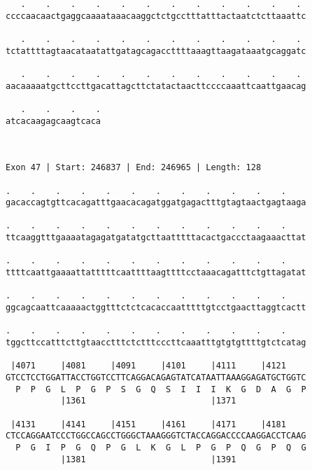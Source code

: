 \documentclass{article}
\begin{document}
\begin{Verbatim}
   .    .    .    .    .    .    .    .    .    .    .    . 
ccccaacaactgaggcaaaataaacaaggctctgcctttatttactaatctcttaaattc
                                                            
   .    .    .    .    .    .    .    .    .    .    .    . 
tctattttagtaacataatattgatagcagaccttttaaagttaagataaatgcaggatc
                                                            
   .    .    .    .    .    .    .    .    .    .    .    . 
aacaaaaatgcttccttgacattagcttctatactaacttccccaaattcaattgaacag
                                                            
   .    .    .    .
atcacaagagcaagtcaca
                   
                   
 
Exon 47 | Start: 246837 | End: 246965 | Length: 128
 
.    .    .    .    .    .    .    .    .    .    .    .    
gacaccagtgttcacagatttgaacacagatggatgagactttgtagtaactgagtaaga
                                                            
.    .    .    .    .    .    .    .    .    .    .    .    
ttcaaggtttgaaaatagagatgatatgcttaatttttacactgaccctaagaaacttat
                                                            
.    .    .    .    .    .    .    .    .    .    .    .    
ttttcaattgaaaattatttttcaattttaagttttcctaaacagatttctgttagatat
                                                            
.    .    .    .    .    .    .    .    .    .    .    .    
ggcagcaattcaaaaactggtttctctcacaccaatttttgtcctgaacttaggtcactt
                                                            
.    .    .    .    .    .    .    .    .    .    .    .    
tggcttccatttcttgtaacctttctctttcccttcaaatttgtgtgttttgtctcatag
                                                            
 |4071     |4081     |4091     |4101     |4111     |4121    
GTCCTCCTGGATTACCTGGTCCTTCAGGACAGAGTATCATAATTAAAGGAGATGCTGGTC
  P  P  G  L  P  G  P  S  G  Q  S  I  I  I  K  G  D  A  G  P
           |1361                         |1371              
  
 |4131     |4141     |4151     |4161     |4171     |4181    
CTCCAGGAATCCCTGGCCAGCCTGGGCTAAAGGGTCTACCAGGACCCCAAGGACCTCAAG
  P  G  I  P  G  Q  P  G  L  K  G  L  P  G  P  Q  G  P  Q  G
           |1381                         |1391              
  

\end{Verbatim}
\end{document}
